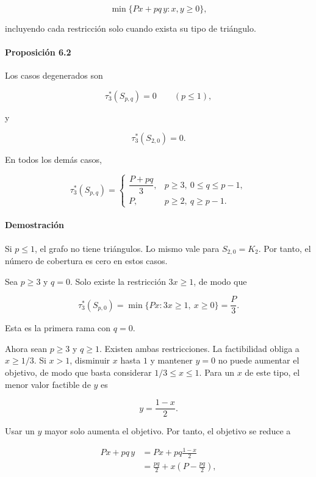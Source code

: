 \documentclass[spanish,11pt,a4paper]{article}
\begin{document}
\[
\min\{Px+pq\,y:x,y\ge0\},
\]

incluyendo cada restricción solo cuando exista su tipo de triángulo.

\paragraph{Proposición 6.2}\label{proposiciuxf3n-6.2}

Los casos degenerados son

\[
\tau_3^*(S_{p,q})=0
\qquad
(p\le1),
\]

y

\[
\tau_3^*(S_{2,0})=0.
\]

En todos los demás casos,

\[
\boxed{
\tau_3^*(S_{p,q})
=
\begin{cases}
\dfrac{P+pq}{3},
& p\ge3,\ 0\le q\le p-1,\\[3mm]
P,
& p\ge2,\ q\ge p-1.
\end{cases}
}
\]

\paragraph{Demostración}\label{demostraciuxf3n-9}

Si \(p\le1\), el grafo no tiene triángulos. Lo mismo vale para
\(S_{2,0}=K_2\). Por tanto, el número de cobertura es cero en estos
casos.

Sea \(p\ge3\) y \(q=0\). Solo existe la restricción \(3x\ge1\), de modo
que

\[
\tau_3^*(S_{p,0})
=
\min\{Px:3x\ge1,\ x\ge0\}
=
\frac P3.
\]

Esta es la primera rama con \(q=0\).

Ahora sean \(p\ge3\) y \(q\ge1\). Existen ambas restricciones. La
factibilidad obliga a \(x\ge1/3\). Si \(x>1\), disminuir \(x\) hasta
\(1\) y mantener \(y=0\) no puede aumentar el objetivo, de modo que
basta considerar \(1/3\le x\le1\). Para un \(x\) de este tipo, el menor
valor factible de \(y\) es

\[
y=\frac{1-x}{2}.
\]

Usar un \(y\) mayor solo aumenta el objetivo. Por tanto, el objetivo se
reduce a

\[
\begin{aligned}
Px+pq\,y
&=
Px+pq\frac{1-x}{2}\\
&=
\frac{pq}{2}
+
x\left(P-\frac{pq}{2}\right),
\end{aligned}
\]
\end{document}
